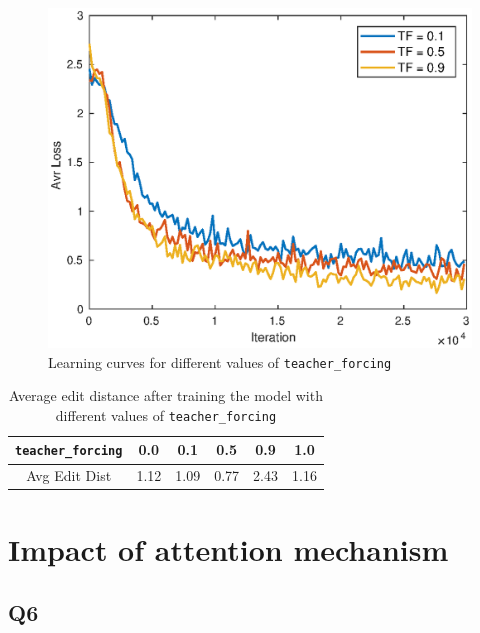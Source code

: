 \documentclass[12pt]{article}
\begin{document}
\begin{figure}[h]
    \centering
    \includegraphics[width=\linewidth]{img/teacher_forcing3.eps}
    \caption{Learning curves for different values of \texttt{teacher\_forcing}}
    \label{fig_teacher}
\end{figure}

\begin{table}[h]
    \begin{center}
     \begin{tabular}{|c || c | c | c | c | c |} 
     \hline
     \texttt{teacher\_forcing} & 0.0 & 0.1 & 0.5 & 0.9 & 1.0 \\ [0.5ex] 
     \hline
     Avg Edit Dist & 1.12 & 1.09 & 0.77 & 2.43 & 1.16 \\ 
     \hline
    \end{tabular}
    \end{center}
    \caption{Average edit distance after training the model with different values of \texttt{teacher\_forcing}}
    \label{table_teacher_forcing}
\end{table}


\section{Impact of attention mechanism}

\subsection{Q6}
\end{document}
